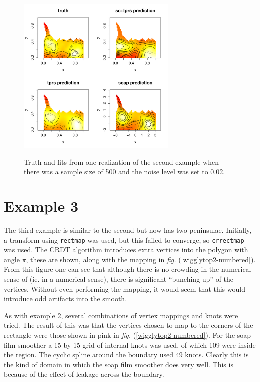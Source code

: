 \documentclass[a4paper,10pt]{amsart}
\newcommand{\fig}[1]{\emph{fig.} (\ref{#1})}
\begin{document}
\begin{figure}
\centering
\includegraphics[width=3in]{figs-otherdomains/wigglytop-real.pdf} \\
\caption{Truth and fits from one realization of the second example when there was a sample size of 500 and the noise level was set to 0.02. }
\label{wigglytop-real}
\end{figure}





\section{Example 3}

The third example is similar to the second but now has two peninsulae. Initially, a transform using \texttt{rectmap} was used, but this failed to converge, so \texttt{crrectmap} was used. The CRDT algorithm introduces extra vertices into the polygon with angle $\pi$, these are shown, along with the mapping in \fig{wigglytop2-numbered}. From this figure one can see that although there is no crowding in the numerical sense of \cite{driscoll} (ie. in a numerical sense), there is significant ``bunching-up'' of the vertices. Without even performing the mapping, it would seem that this would introduce odd artifacts into the smooth.

As with example 2, several combinations of vertex mappings and knots were tried. The result of this was that the vertices chosen to map to the corners of the rectangle were those shown in pink in \fig{wigglytop2-numbered}. For the soap film smoother a 15 by 15 grid of internal knots was used, of which 109 were inside the region. The cyclic spline around the boundary used 49 knots. Clearly this is the kind of domain in which the soap film smoother does very well. This is because of the effect of leakage across the boundary.
\end{document}
